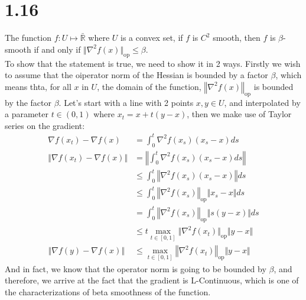 \documentclass[]{article}
\begin{document}
\section*{1.16}
    The function $f:U\mapsto \bar{\mathbb{R}}$ where $U$ is a convex set, if $f$ is $C^2$ smooth, then $f$ is $\beta$-smooth if and only if $\Vert \nabla^2f(x)\Vert_{\text{op}}\le \beta$. 
    \\[1.1em] 
    To show that the statement is true, we need to show it in 2 ways. Firstly we wish to assume that the oiperator norm of the Hessian is bounded by a factor $\beta$, which means thta, for all $x$ in $U$, the domain of the function, $\left\Vert
        \nabla^2f(x)
    \right\Vert_{\text{op}}$ is bounded by the factor $\beta$. Let's start with a line with 2 points $x, y \in U$, and interpolated by a parameter $t\in(0, 1)$  where $x_t = x + t(y - x)$, then we make use of Taylor series on the gradient: 
    \\
    \begin{align*}\tag{1.16.1}\label{eqn:1.16.1}
        \nabla f(x_t)  - \nabla f(x) &= \int_{0}^{t} \nabla^2 f(x_s)(x_s - x)ds
        \\
        \Vert \nabla f(x_t)  - \nabla f(x)\Vert &= 
        \left\Vert \int_{0}^{t} \nabla^2 f(x_s)(x_s - x)ds\right\Vert
        \\
        &\le \int_{0}^{t} 
            \left\Vert
                \nabla^2 f(x_s)(x_s - x)
            \right\Vert
        ds
        \\
        &\le \int_{0}^{t} 
            \left\Vert
                 \nabla^2 f(x_s)
            \right\Vert_{\text{op}}
            \Vert x_s - x\Vert
        ds
        \\
        &= 
        \int_{0}^{t} 
            \left\Vert
                 \nabla^2 f(x_s)
            \right\Vert_{\text{op}}
            \Vert s(y - x)\Vert
        ds
        \\
        & \le
        t \max_{t \in [0, 1]} \Vert \nabla^2 f(x_t)\Vert_{\text{op}}\Vert y - x\Vert
        \\
        \left\Vert
            \nabla f(y) - \nabla f(x)
        \right\Vert &\le
        \max_{t\in [0, 1]}\left\Vert
             \nabla^2 f(x_t)
        \right\Vert_{\text{op}} \Vert y - x\Vert
    \end{align*}
    And in fact, we know that the operator norm  is going to be bounded by $\beta$, and therefore, we arrive at the fact that the gradient is L-Continuous, which is one of the characterizations of beta smoothness of the function. 
\end{document}
